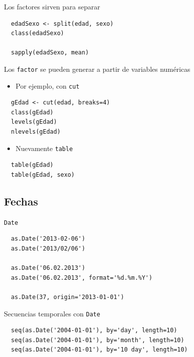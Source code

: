 \documentclass[xcolor={usenames,svgnames,dvipsnames}]{beamer}
\begin{document}
\begin{frame}[fragile,label=sec-5-1-4]{Los factores sirven para separar}
 \lstset{language=R,label= ,caption= ,numbers=none}
\begin{lstlisting}
  edadSexo <- split(edad, sexo)
  class(edadSexo)
  
  sapply(edadSexo, mean)
\end{lstlisting}
\end{frame}

\begin{frame}[fragile,label=sec-5-1-5]{Los \texttt{factor} se pueden generar a partir de variables numéricas}
 \begin{itemize}
\item Por ejemplo, con \texttt{cut}
\end{itemize}
\lstset{language=R,label= ,caption= ,numbers=none}
\begin{lstlisting}
  gEdad <- cut(edad, breaks=4)
  class(gEdad)
  levels(gEdad)
  nlevels(gEdad)
\end{lstlisting}

\begin{itemize}
\item Nuevamente \texttt{table}
\end{itemize}
\lstset{language=R,label= ,caption= ,numbers=none}
\begin{lstlisting}
  table(gEdad)
  table(gEdad, sexo)
\end{lstlisting}
\end{frame}

\subsection{Fechas}
\label{sec-5-2}

\begin{frame}[fragile,label=sec-5-2-1]{\texttt{Date}}
 \lstset{language=R,label= ,caption= ,numbers=none}
\begin{lstlisting}
  as.Date('2013-02-06')
  as.Date('2013/02/06')
  
  as.Date('06.02.2013')
  as.Date('06.02.2013', format='%d.%m.%Y')
  
  as.Date(37, origin='2013-01-01')
\end{lstlisting}
\end{frame}

\begin{frame}[fragile,label=sec-5-2-2]{Secuencias temporales con \texttt{Date}}
 \lstset{language=R,label= ,caption= ,numbers=none}
\begin{lstlisting}
  seq(as.Date('2004-01-01'), by='day', length=10)
  seq(as.Date('2004-01-01'), by='month', length=10)
  seq(as.Date('2004-01-01'), by='10 day', length=10)
\end{lstlisting}
\end{frame}
\end{document}
